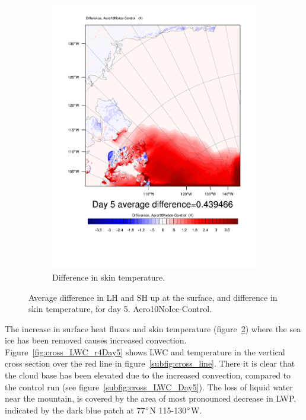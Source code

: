 \begin{figure}
	\begin{subfigure}{0.48\textwidth}
		\includegraphics[width=\textwidth]{results/aero10ni/diff_Aero10NoIce_TSK_Day5.pdf}
		\caption{Difference in skin temperature.}
		\label{subfig:skin_r4Day5}
	\end{subfigure}
	\caption{Average difference in LH and SH up at the surface, and difference in skin temperature, for day 5. Aero10NoIce-Control.}
	\label{fig:lhshskin_r4Day5}
\end{figure}

The increase in surface heat fluxes and skin temperature (figure~\ref{fig:lhshskin_r4Day5}) where the sea ice has been removed causes increased convection. Figure~\ref{fig:cross_LWC_r4Day5} shows LWC and temperature in the vertical cross section over the red line in figure~\ref{subfig:cross_line}. There it is clear that the cloud base has been elevated due to the increased convection, compared to the control run (see figure~\ref{subfig:cross_LWC_Day5}). The loss of liquid water near the mountain, is covered by the area of most pronounced decrease in LWP, indicated by the dark blue patch at 77$\degree$N 115-130$\degree$W.

